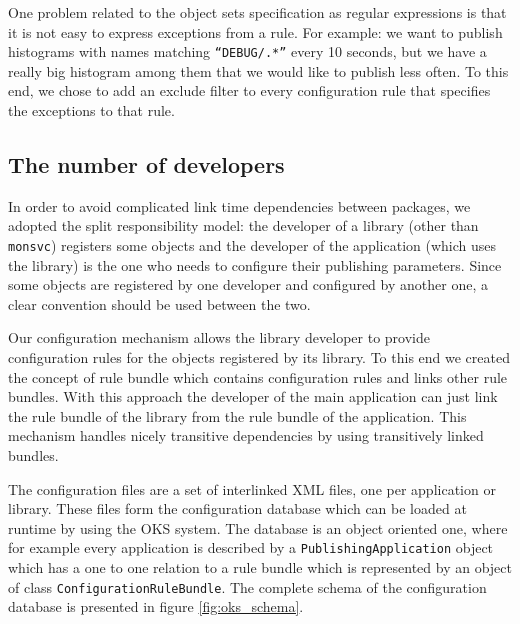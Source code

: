One problem related to the object sets specification as regular expressions is that it is not easy to express exceptions from a rule. For example: we want to publish histograms with names matching {\tt “DEBUG/.*”} every 10 seconds, but we have a really big histogram among them that we would like to publish less often. To this end, we chose to add an exclude filter to every configuration rule that specifies the exceptions to that rule.

\subsection*{The number of developers}

In order to avoid complicated link time dependencies between packages, we adopted the split responsibility model: the developer of a library (other than {\tt monsvc}) registers some objects and the developer of the application (which uses the library) is the one who needs to configure their publishing parameters. Since some objects are registered by one developer and configured by another one, a clear convention should be used between the two. 

Our configuration mechanism allows the library developer to provide configuration rules for the objects registered by its library. To this end we created the concept of rule bundle which contains configuration rules and links other rule bundles. With this approach the developer of the main application can just link the rule bundle of the library from the rule bundle of the application. This mechanism handles nicely transitive dependencies by using transitively linked bundles.

The configuration files are a set of interlinked XML files, one per application or library. These files form the configuration database which can be loaded at runtime by using the OKS system. The database is an object oriented one, where for example every application is described by a {\tt PublishingApplication} object which has a one to one relation to a rule bundle which is represented by an object of class {\tt ConfigurationRuleBundle}. The complete schema of the configuration database is presented in figure \ref{fig:oks_schema}. 

